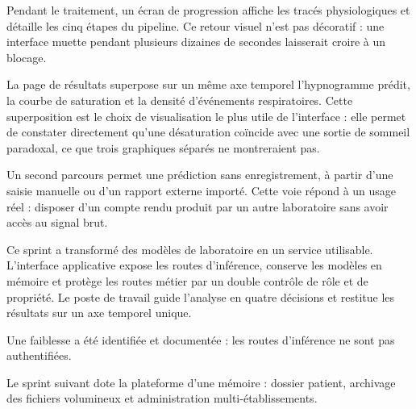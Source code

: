 
Pendant le traitement, un écran de progression affiche les tracés physiologiques et
détaille les cinq étapes du pipeline. Ce retour visuel n'est pas décoratif : une interface
muette pendant plusieurs dizaines de secondes laisserait croire à un blocage.


La page de résultats superpose sur un même axe temporel l'hypnogramme prédit, la courbe de
saturation et la densité d'événements respiratoires. Cette superposition est le choix de
visualisation le plus utile de l'interface : elle permet de constater directement qu'une
désaturation coïncide avec une sortie de sommeil paradoxal, ce que trois graphiques séparés
ne montreraient pas.


Un second parcours permet une prédiction sans enregistrement, à partir d'une saisie manuelle
ou d'un rapport externe importé. Cette voie répond à un usage réel : disposer d'un compte
rendu produit par un autre laboratoire sans avoir accès au signal brut.



Ce sprint a transformé des modèles de laboratoire en un service utilisable. L'interface
applicative expose les routes d'inférence, conserve les modèles en mémoire et protège les
routes métier par un double contrôle de rôle et de propriété. Le poste de travail guide
l'analyse en quatre décisions et restitue les résultats sur un axe temporel unique.

Une faiblesse a été identifiée et documentée : les routes d'inférence ne sont pas
authentifiées.

Le sprint suivant dote la plateforme d'une mémoire : dossier patient, archivage des fichiers
volumineux et administration multi-établissements.
